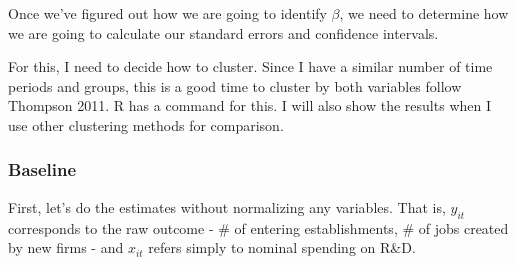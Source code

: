 \documentclass[11pt]{article}
\begin{document}
Once we've figured out how we are going to identify \(\beta\), we need
to determine how we are going to calculate our standard errors and
confidence intervals.

For this, I need to decide how to cluster. Since I have a similar number
of time periods and groups, this is a good time to cluster by both
variables follow Thompson 2011. R has a command for this. I will also
show the results when I use other clustering methods for comparison.

    \hypertarget{baseline}{%
\subsubsection{Baseline}\label{baseline}}

First, let's do the estimates without normalizing any variables. That
is, \(y_{it}\) corresponds to the raw outcome - \# of entering
establishments, \# of jobs created by new firms - and \(x_{it}\) refers
simply to nominal spending on R\&D.
\end{document}
